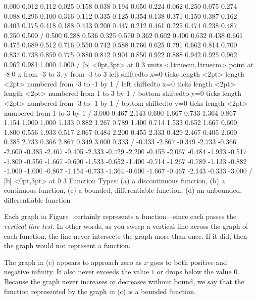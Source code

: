 {\setquadratic
{} 0.000 0.012 0.112 0.025 0.158 0.038 0.194 0.050 0.224 
0.062 0.250 0.075 0.274 0.088 0.296 0.100 0.316 0.112 0.335 
0.125 0.354 0.138 0.371 0.150 0.387 0.162 0.403 0.175 0.418 
0.188 0.433 0.200 0.447 0.212 0.461 0.225 0.474 0.238 0.487 
0.250 0.500 / 
 0.500 0.288 0.536 0.325 0.570 0.362 0.602 0.400 0.632 
0.438 0.661 0.475 0.689 0.512 0.716 0.550 0.742 0.588 0.766 
0.625 0.791 0.662 0.814 0.700 0.837 0.738 0.859 0.775 0.880 
0.812 0.901 0.850 0.922 0.888 0.942 0.925 0.962 0.962 0.981 
1.000 1.000 /
 [b] <0pt,3pt> at 0 3
\setcoordinatesystem units <1truecm,1truecm> point at -8 0
\setplotarea x from -3 to 3, y from -3 to 3
\axis left shiftedto x=0 ticks length <2pt> length <2pt> numbered from -3 to -1 by 1 /
\axis left shiftedto x=0 ticks length <2pt> length <2pt> numbered from 1 to 3 by 1 /
\axis bottom shiftedto y=0 ticks length <2pt> numbered from -3 to -1 by 1 /
\axis bottom shiftedto y=0 ticks length <2pt> numbered from 1 to 3 by 1 /
\setquadratic
{} 3.000 0.467 2.143 0.600 1.667 0.733 1.364 0.867 1.154 
1.000 1.000 1.133 0.882 1.267 0.789 1.400 0.714 1.533 0.652 
1.667 0.600 1.800 0.556 1.933 0.517 2.067 0.484 2.200 0.455 
2.333 0.429 2.467 0.405 2.600 0.385 2.733 0.366 2.867 0.349 
3.000 0.333 /
 -0.333 -2.867 -0.349 -2.733 -0.366 -2.600 -0.385 -2.467 -0.405 
-2.333 -0.429 -2.200 -0.455 -2.067 -0.484 -1.933 -0.517 -1.800 -0.556 
-1.667 -0.600 -1.533 -0.652 -1.400 -0.714 -1.267 -0.789 -1.133 -0.882 
-1.000 -1.000 -0.867 -1.154 -0.733 -1.364 -0.600 -1.667 -0.467 -2.143 
-0.333 -3.000 /
 [b] <0pt,3pt> at 0 3
\endpicture}
\endtexonly
{}
\begincaption
Function Types: (a) a discontinuous function, (b) a
  continuous function, (c) a bounded, differentiable function, (d) an
  unbounded, differentiable function
\endcaption
\endfigure

  Each graph in
Figure~
certainly represents a function---since each passes the {\em vertical
line test}.  In other words, as you sweep a vertical line across the graph
of each function, the line never intersects the graph more than once.  If
it did, then the graph would not represent a function.

 The graph in (c) appears to approach zero as $x$ goes
to both positive and negative infinity.  It also never exceeds the value
$1$ or drops below the value $0$.  Because the graph never increases or
decreases without bound, we say that the function represented by the graph
in (c) is a {\dfont bounded} 
function.  

